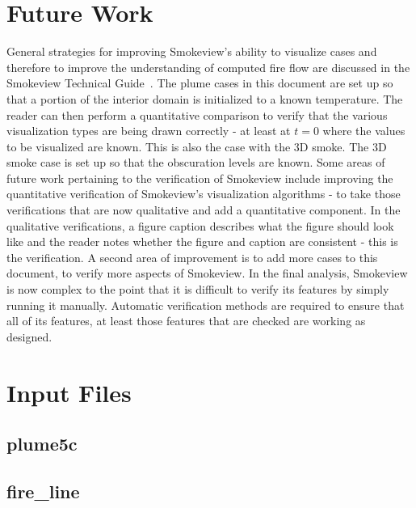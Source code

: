 \documentclass[11pt,twoside]{book}
\newcommand{\fdsinput}[1]{
{
\scriptsize

}
}
\begin{document}
\chapter{Future Work}
General strategies for improving Smokeview's ability to visualize cases and therefore to improve the understanding of computed fire flow are discussed in the Smokeview Technical Guide~\cite{Smokeview_Verification_Guide}.   The plume cases in this document are set up so that a portion of the interior domain is initialized to a known temperature.  The reader can then perform a quantitative comparison to verify that the various visualization types are being drawn correctly - at least at $t=0$ where the values to be visualized are known.  This is also the case with the 3D smoke.  The 3D smoke case is set up so that the obscuration levels are known.
Some areas of future work pertaining to the verification of Smokeview include improving the quantitative verification of Smokeview's visualization algorithms - to take those verifications that are now qualitative and add a quantitative component.  In the qualitative verifications, a figure caption describes what the figure should look like and the reader notes whether the figure and caption are consistent - this is the verification.  A second area of improvement is to add more cases to this document, to verify more aspects of Smokeview.  In the final analysis, Smokeview is now complex to the point that it is difficult to verify its features by simply running it manually.  Automatic verification methods are required to ensure that all of its features, at least those features that are checked are working as designed.





\appendix
{}

\chapter{Input Files}
\label{fdsinputfiles}
\section{plume5c}
\label{FDSplume5c}
\fdsinput{plume5c.fds}

\section{fire\_line}
\label{FDSfireline}
\fdsinput{../Wui/fire_line.fds}
\end{document}
